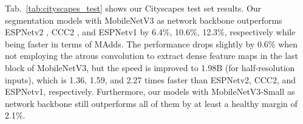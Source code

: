 \documentclass[10pt,twocolumn,letterpaper]{article}
\begin{document}
%

Tab.~\ref{tab:cityscapes_test} shows our Cityscapes test set results. Our segmentation models with MobileNetV3 as network backbone outperforms ESPNetv2 \cite{DBLP:journals/corr/abs-1811-11431}, CCC2 \cite{DBLP:journals/corr/abs-1812-04920}, and ESPNetv1 \cite{DBLP:journals/corr/abs-1811-11431} by 6.4\%, 10.6\%, 12.3\%, respectively while being faster in terms of MAdds. The performance drops slightly by 0.6\% when not employing the atrous convolution to extract dense feature maps in the last block of MobileNetV3, but the speed is improved to 1.98B (for half-resolution inputs), which is 1.36, 1.59, and 2.27 times faster than ESPNetv2, CCC2, and ESPNetv1, respectively. Furthermore, our models with MobileNetV3-Small as network backbone still outperforms all of them by at least a healthy margin of 2.1\%. %
\end{document}
